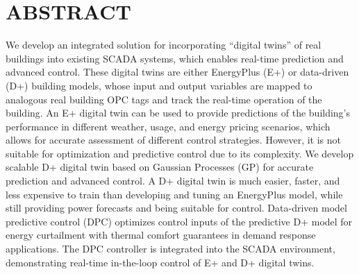\section{ABSTRACT}

We develop an integrated solution for incorporating ``digital twins” of real buildings into existing SCADA systems, which enables real-time prediction and advanced control. 
These digital twins are either EnergyPlus (E+) or data-driven (D+) building models, whose input and output variables are mapped to analogous real building OPC tags and track the real-time operation of the building.
An E+ digital twin can be used to provide predictions of the building’s performance in different weather, usage, and energy pricing scenarios, which allows for accurate assessment of different control strategies. 
However, it is not suitable for optimization and predictive control due to its complexity. 
We develop scalable D+ digital twin based on Gaussian Processes (GP) for accurate prediction and advanced control. 
A D+ digital twin is much easier, faster, and less expensive to train than developing and tuning an EnergyPlus model, while still providing power forecasts and being suitable for control. 
Data-driven model predictive control (DPC) optimizes control inputs of the predictive D+ model for energy curtailment with thermal comfort guarantees in demand response applications. 
The DPC controller is integrated into the SCADA environment, demonstrating real-time in-the-loop control of E+ and D+ digital twins. 
